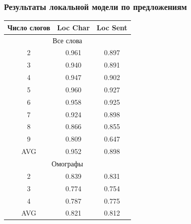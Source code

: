 \documentclass[russian]{beamer}
\begin{document}
\begin{frame}
\frametitle{Результаты локальной модели по предложениям}
\begin{table}[H]
\begin{small}
	\begin{center}
		\begin{tabular}{|c|c|c|}
			\hline
			Число слогов & Loc Char & Loc Sent \\ \hline
			\multicolumn{3}{|c|}{Все слова}                          \\ \hline
			2       &      0.961       &         0.897          \\ \hline
			3       &      0.940       &         0.891          \\ \hline
			4       &      0.947       &         0.902          \\ \hline
			5       &      0.960       &         0.927          \\ \hline
			6       &      0.958       &         0.925          \\ \hline
			7       &      0.924       &         0.898          \\ \hline
			8       &      0.866       &         0.855          \\ \hline
			9       &      0.809       &         0.647          \\ \hline
			AVG    &      0.952       &         0.898          \\ \hline
			\multicolumn{3}{|c|}{Омографы}                           \\ \hline
			2       &      0.839       &         0.831          \\ \hline
			3       &      0.774       &         0.754          \\ \hline
			4       &      0.787       &         0.775          \\ \hline
			AVG    &      0.821       &         0.812          \\ \hline
		\end{tabular}
	\end{center}
\end{small}

\label{table:local_sent}
\end{table}

\end{frame}
\end{document}
